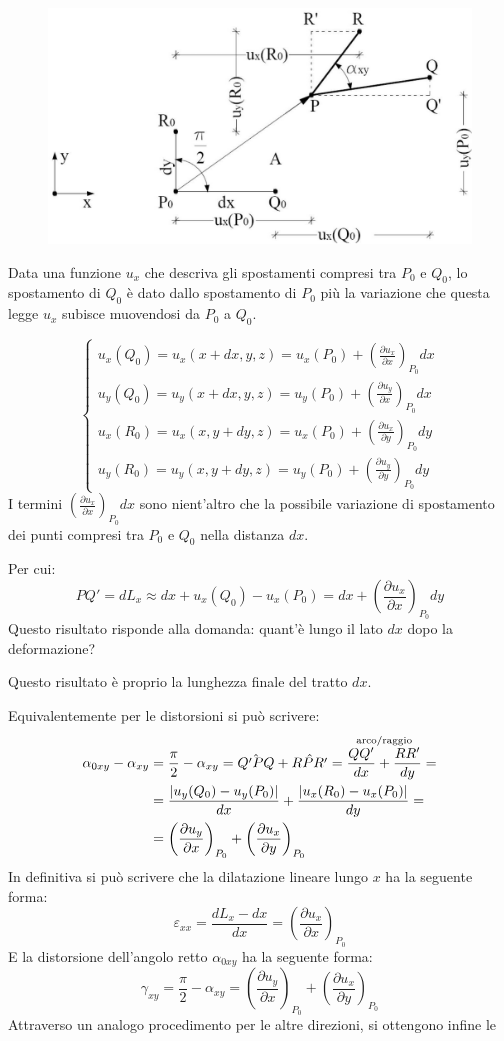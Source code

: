 \documentclass{article}
\begin{document}
\begin{adjustwidth}{2in}{}
\begin{figure}[H]
	\centering
	\includegraphics[width=0.5\linewidth]{immagini/1.PARTE7_Pagina_24}
\end{figure}
	Data una funzione $u_x$ che descriva gli spostamenti compresi tra $P_0$ e $Q_0$, lo spostamento di $Q_0$ è dato dallo spostamento di $P_0$ più la variazione che questa legge $u_x$ subisce muovendosi da $P_0$ a $Q_0$.
	 
	\[
	\begin{cases}
		u_x(Q_0) = u_x(x+dx, y, z) = u_x(P_0) + \left( \frac{\partial u_x}{\partial x}\right)_{P_0}dx\\
	u_y(Q_0) = u_y(x+dx, y, z) = u_y(P_0) + \left( \frac{\partial u_y}{\partial x}\right)_{P_0}dx\\
	u_x(R_0) = u_x(x, y+dy, z) = u_x(P_0) + \left( \frac{\partial u_x}{\partial y}\right)_{P_0}dy\\
	u_y(R_0) = u_y(x, y+dy, z) = u_y(P_0) + \left( \frac{\partial u_y}{\partial y}\right)_{P_0}dy
	\end{cases}
	\]
	I termini $\left( \frac{\partial u_x}{\partial x}\right)_{P_0}dx$ sono nient'altro che la possibile variazione di spostamento dei punti compresi  tra $P_0$ e $Q_0$ nella distanza $dx$.
	
	Per cui:
	\[
	PQ'= dL_x \approx  dx + u_x(Q_0) - u_x(P_0) = dx + \left( \frac{\partial u_x}{\partial x} \right)_{P_0}dy 	
	\]
	Questo risultato risponde alla domanda: quant'è lungo il lato $dx$ dopo la deformazione?
	
	Questo risultato è proprio la lunghezza finale del tratto $dx$. \newline
	
	Equivalentemente per le distorsioni si può scrivere:
	\[
	\begin{split}
			\alpha_{0xy} - \alpha_{xy} & = \frac{\pi}{2} - \alpha_{xy} = \hat{Q'PQ} + \hat{RPR'} = \overset{\text{arco/raggio}}{{QQ'\over dx} + {RR'\over dy}} = \\
			& = \frac{|u_y(Q_0) - u_y(P_0)|}{dx} + \frac{|u_x(R_0) - u_x(P_0)|}{dy} = \\
			& = \left( \frac{\partial u_y}{\partial x}\right)_{P_0} + \left( \frac{\partial u_x}{\partial y}\right)_{P_0}
	\end{split}
	\]
	In definitiva si può scrivere che la dilatazione lineare lungo $x$ ha la seguente forma:
	\[ \varepsilon_{xx} = \frac{dL_x - dx}{dx} = \left( \frac{\partial u_x}{\partial x}\right)_{P_0} \]
	E la distorsione dell'angolo retto $\alpha_{0xy}$ ha la seguente forma:
	\[\gamma_{xy} = \frac{\pi}{2} - \alpha_{xy} = \left( \frac{\partial u_y}{\partial x}\right)_{P_0} + \left( \frac{\partial u_x}{\partial y}\right)_{P_0}\]
\newpage	
	Attraverso un analogo procedimento per le altre direzioni, si ottengono infine le \newline 
	

\end{adjustwidth}
\end{document}
